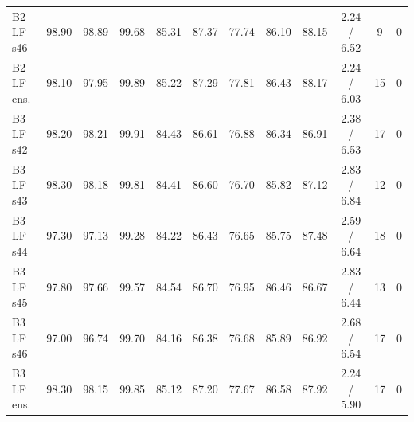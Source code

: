 \begin{table}[!ht]
\begin{tabular}{lccccccccccc}
B2 LF s46 & 98.90 & 98.89 & 99.68 & 85.31 & 87.37 & 77.74 & 86.10 & 88.15 & 2.24 / 6.52 & 9 & 0 \\
B2 LF ens. & 98.10 & 97.95 & 99.89 & 85.22 & 87.29 & 77.81 & 86.43 & 88.17 & 2.24 / 6.03 & 15 & 0 \\
B3 LF s42 & 98.20 & 98.21 & 99.91 & 84.43 & 86.61 & 76.88 & 86.34 & 86.91 & 2.38 / 6.53 & 17 & 0 \\
B3 LF s43 & 98.30 & 98.18 & 99.81 & 84.41 & 86.60 & 76.70 & 85.82 & 87.12 & 2.83 / 6.84 & 12 & 0 \\
B3 LF s44 & 97.30 & 97.13 & 99.28 & 84.22 & 86.43 & 76.65 & 85.75 & 87.48 & 2.59 / 6.64 & 18 & 0 \\
B3 LF s45 & 97.80 & 97.66 & 99.57 & 84.54 & 86.70 & 76.95 & 86.46 & 86.67 & 2.83 / 6.44 & 13 & 0 \\
B3 LF s46 & 97.00 & 96.74 & 99.70 & 84.16 & 86.38 & 76.68 & 85.89 & 86.92 & 2.68 / 6.54 & 17 & 0 \\
B3 LF ens. & 98.30 & 98.15 & 99.85 & 85.12 & 87.20 & 77.67 & 86.58 & 87.92 & 2.24 / 5.90 & 17 & 0 \\
\bottomrule
\end{tabular}
\end{table}

